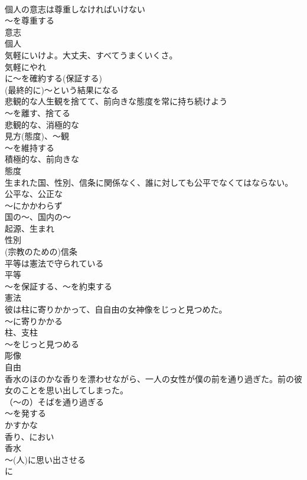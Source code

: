 \documentclass[8pt]{extreport}
\begin{document}
\begin{CJK}{UTF8}{min}
\\	個人の意志は尊重しなければいけない	
\\	〜を尊重する 
\\	意志 
\\	個人
\\	気軽にいけよ。大丈夫、すべてうまくいくさ。	
\\	気軽にやれ 
\\	に〜を確約する(保証する) 
\\	(最終的に)〜という結果になる
\\	悲観的な人生観を捨てて、前向きな態度を常に持ち続けよう	
\\	～を離す、捨てる 
\\	悲観的な、消極的な 
\\	見方(態度)、～観 
\\	～を維持する 
\\	積極的な、前向きな 
\\	態度
\\	生まれた国、性別、信条に関係なく、誰に対しても公平でなくてはならない。	
\\	公平な、公正な 
\\	～にかかわらず 
\\	国の～、国内の～ 
\\	起源、生まれ 
\\	性別
\\	(宗教のための)信条
\\	平等は憲法で守られている	
\\	平等 
\\	～を保証する、～を約束する 
\\	憲法
\\	彼は柱に寄りかかって、自自由の女神像をじっと見つめた。	
\\	～に寄りかかる 
\\	柱、支柱 
\\	～をじっと見つめる 
\\	彫像 
\\	自由
\\	香水のほのかな香りを漂わせながら、一人の女性が僕の前を通り過ぎた。前の彼女のことを思い出してしまった。	
\\	（～の）そばを通り過ぎる 
\\	～を発する 
\\	かすかな 
\\	香り、におい 
\\	香水 
\\	～(人)に思い出させる 
\\	に

\end{CJK}
\end{document}
